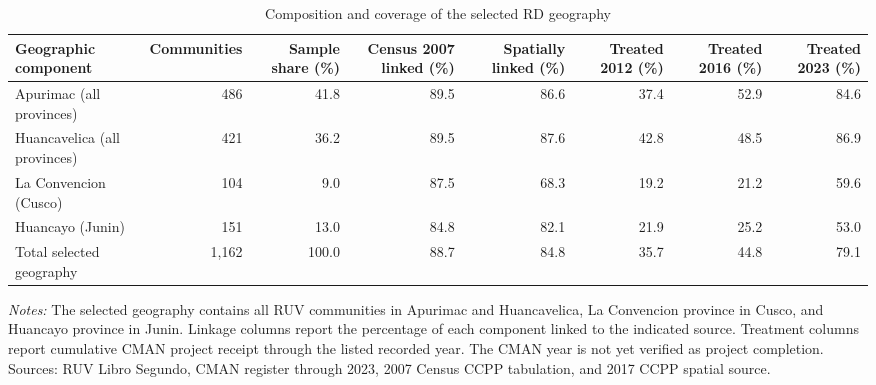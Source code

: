 \begin{table}[!htbp]
\centering
\caption{Composition and coverage of the selected RD geography}
\label{tab:desc_main_rd_sample_profile}
\begin{tabular}{lrrrrrrr}
\toprule
Geographic component & Communities & Sample share (\%) & Census 2007 linked (\%) & Spatially linked (\%) & Treated 2012 (\%) & Treated 2016 (\%) & Treated 2023 (\%) \\
\midrule
Apurimac (all provinces) & 486 & 41.8 & 89.5 & 86.6 & 37.4 & 52.9 & 84.6 \\
Huancavelica (all provinces) & 421 & 36.2 & 89.5 & 87.6 & 42.8 & 48.5 & 86.9 \\
La Convencion (Cusco) & 104 & 9.0 & 87.5 & 68.3 & 19.2 & 21.2 & 59.6 \\
Huancayo (Junin) & 151 & 13.0 & 84.8 & 82.1 & 21.9 & 25.2 & 53.0 \\
\midrule
Total selected geography & 1,162 & 100.0 & 88.7 & 84.8 & 35.7 & 44.8 & 79.1 \\
\bottomrule
\end{tabular}
\parbox{0.99\linewidth}{\footnotesize \textit{Notes:} The selected geography contains all RUV communities in Apurimac and Huancavelica, La Convencion province in Cusco, and Huancayo province in Junin. Linkage columns report the percentage of each component linked to the indicated source. Treatment columns report cumulative CMAN project receipt through the listed recorded year. The CMAN year is not yet verified as project completion. Sources: RUV Libro Segundo, CMAN register through 2023, 2007 Census CCPP tabulation, and 2017 CCPP spatial source.}
\end{table}
